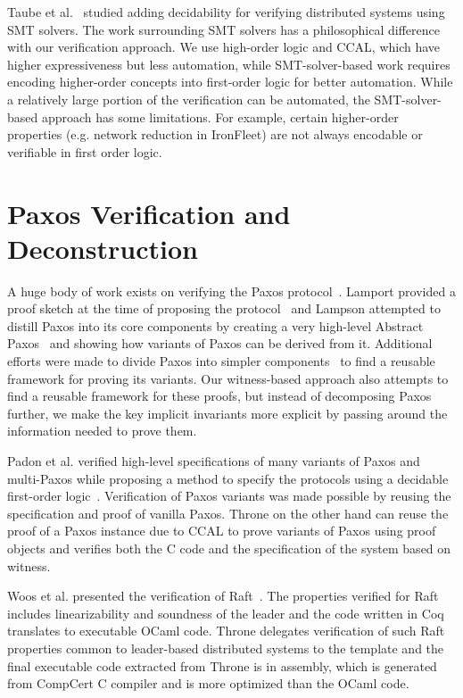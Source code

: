 Taube et al.~\cite{modular} studied adding
decidability for verifying distributed systems using SMT solvers.
The work surrounding SMT solvers has a philosophical difference with our verification approach.
We use high-order logic and CCAL, which have higher expressiveness but less automation,
while SMT-solver-based work requires encoding higher-order concepts into
first-order logic for better automation. While a relatively large portion of the
verification can be automated, the SMT-solver-based approach has some limitations.
For example, certain higher-order properties (e.g. network reduction
in IronFleet) are not always encodable or verifiable in first order logic.


\section{Paxos Verification and Deconstruction}
A huge body of work exists on verifying the Paxos protocol~\cite{paxos}.
Lamport provided a proof sketch at the time of proposing the protocol~\cite{paxosmadesimple}
and Lampson attempted to distill Paxos into its core components by creating a very
high-level Abstract Paxos~\cite{Lampson2001} and showing how variants of
Paxos can be derived from it. Additional efforts were made to divide Paxos
into simpler components~\cite{dpaxos, sdpaxos} to find a reusable framework for
proving its variants. Our witness-based approach also attempts
to find a reusable framework for these proofs, but instead of decomposing Paxos
further, we make the key implicit invariants more explicit by passing around
the information needed to prove them.

Padon et al. verified high-level specifications of many variants of Paxos
and multi-Paxos while proposing a method to specify the protocols using
a decidable first-order logic~\cite{paxosepr}. Verification of Paxos
variants was made possible by reusing the specification and proof of vanilla
Paxos. Throne on the other hand can reuse the proof of a Paxos instance
due to CCAL to prove variants of Paxos using proof objects and verifies both the
C code and the specification of the system based on witness.


Woos et al. presented the verification of Raft~\cite{cppraft}. The properties
verified for Raft includes linearizability and soundness of the leader and
the code written in Coq translates to executable OCaml code. Throne
delegates verification of such Raft properties common to leader-based distributed
systems to the template and the final executable code extracted from
Throne is in assembly, which is generated from CompCert C compiler and is more
optimized than the OCaml code.


